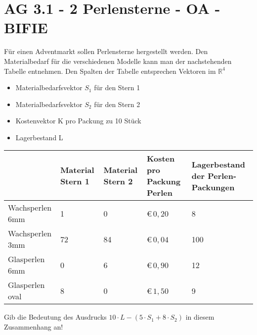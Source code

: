 \section{AG 3.1 - 2 Perlensterne - OA - BIFIE}

\begin{beispiel}[AG 3.1]{1} %
Für einen Adventmarkt sollen Perlensterne hergestellt werden. Den Materialbedarf für die verschiedenen Modelle kann man der nachstehenden Tabelle entnehmen.
Den Spalten der Tabelle entsprechen Vektoren im $\mathbb{R}^{4}$
\begin{itemize}
	\item Materialbedarfsvektor $S_{1}$ für den Stern 1
	\item Materialbedarfsvektor $S_{2}$ für den Stern 2
	\item Kostenvektor K pro Packung zu 10 Stück
	\item Lagerbestand L
\end{itemize}
\begin{longtable}{l|C{2,5cm}|C{2,5cm}|C{3cm}|C{3cm}|}
&Material Stern 1&Material Stern 2&Kosten pro Packung Perlen & Lagerbestand der Perlen-Packungen\\ \hline
Wachsperlen 6mm & 1 & 0 & \euro\,$0,20$ & 8 \\ \hline
Wachsperlen 3mm & 72 & 84 & \euro\,$0,04$ & 100 \\ \hline
Glasperlen 6mm & 0 & 6 & \euro\,$0,90$ & 12 \\ \hline
Glasperlen oval & 8 & 0 & \euro\,$1,50$ & 9 \\ \hline
\end{longtable}

Gib die Bedeutung des Ausdrucks $10\cdot L-(5\cdot S_{1}+8\cdot S_{2})$ in diesem Zusammenhang an!

\end{beispiel}